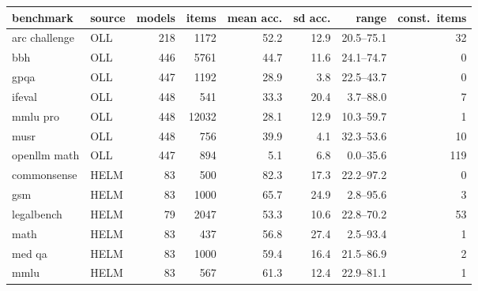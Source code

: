 \begin{tabular}{llrrrrrr}
\toprule
benchmark & source & models & items & mean acc. & sd acc. & range & const.\ items \\
\midrule
arc challenge & OLL & 218 & 1172 & 52.2 & 12.9 & 20.5--75.1 & 32 \\
bbh & OLL & 446 & 5761 & 44.7 & 11.6 & 24.1--74.7 & 0 \\
gpqa & OLL & 447 & 1192 & 28.9 & 3.8 & 22.5--43.7 & 0 \\
ifeval & OLL & 448 & 541 & 33.3 & 20.4 & 3.7--88.0 & 7 \\
mmlu pro & OLL & 448 & 12032 & 28.1 & 12.9 & 10.3--59.7 & 1 \\
musr & OLL & 448 & 756 & 39.9 & 4.1 & 32.3--53.6 & 10 \\
openllm math & OLL & 447 & 894 & 5.1 & 6.8 & 0.0--35.6 & 119 \\
commonsense & HELM & 83 & 500 & 82.3 & 17.3 & 22.2--97.2 & 0 \\
gsm & HELM & 83 & 1000 & 65.7 & 24.9 & 2.8--95.6 & 3 \\
legalbench & HELM & 79 & 2047 & 53.3 & 10.6 & 22.8--70.2 & 53 \\
math & HELM & 83 & 437 & 56.8 & 27.4 & 2.5--93.4 & 1 \\
med qa & HELM & 83 & 1000 & 59.4 & 16.4 & 21.5--86.9 & 2 \\
mmlu & HELM & 83 & 567 & 61.3 & 12.4 & 22.9--81.1 & 1 \\
\bottomrule
\end{tabular}
